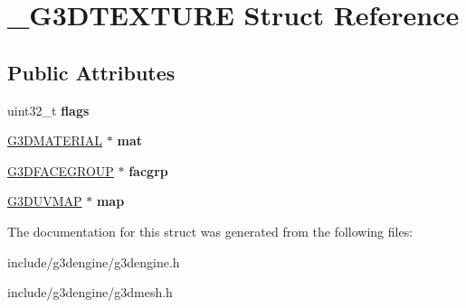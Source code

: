 \hypertarget{struct__G3DTEXTURE}{}\section{\+\_\+\+G3\+D\+T\+E\+X\+T\+U\+RE Struct Reference}
\label{struct__G3DTEXTURE}
\subsection*{Public Attributes}
\begin{DoxyCompactItemize}
\item 
\mbox{\label{struct__G3DTEXTURE_a53d53c73332382396fcdebb18be711e5}} 
uint32\+\_\+t {\bfseries flags}
\item 
\mbox{\label{struct__G3DTEXTURE_ac369835fbb4ebe5f5d05efd4b3218716}} 
\hyperlink{struct__G3DMATERIAL}{G3\+D\+M\+A\+T\+E\+R\+I\+AL} $\ast$ {\bfseries mat}
\item 
\mbox{\label{struct__G3DTEXTURE_a99c70bd4f6fd4a1e1a858b95aac72767}} 
\hyperlink{struct__G3DFACEGROUP}{G3\+D\+F\+A\+C\+E\+G\+R\+O\+UP} $\ast$ {\bfseries facgrp}
\item 
\mbox{\label{struct__G3DTEXTURE_a53eee6d33752d796c4fe2812b7eac778}} 
\hyperlink{struct__G3DUVMAP}{G3\+D\+U\+V\+M\+AP} $\ast$ {\bfseries map}
\end{DoxyCompactItemize}


The documentation for this struct was generated from the following files\+:\begin{DoxyCompactItemize}
\item 
include/g3dengine/g3dengine.\+h\item 
include/g3dengine/g3dmesh.\+h\end{DoxyCompactItemize}
